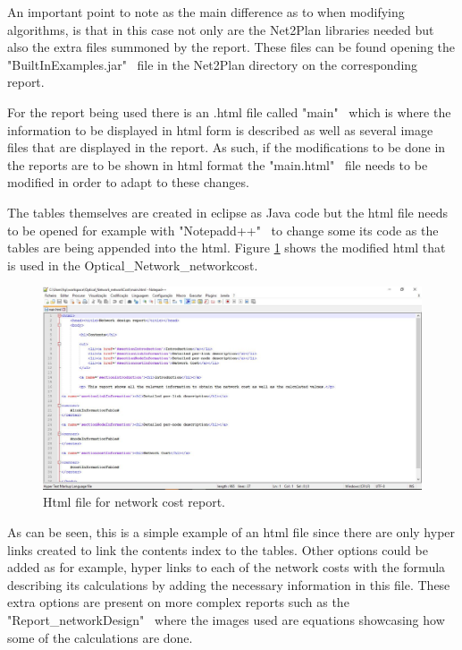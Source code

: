 	An important point to note as the main difference as to when modifying algorithms, is that in this case not only are the Net2Plan libraries needed but also the extra files summoned by the report. These files can be found opening the "BuiltInExamples.jar" \ file in the Net2Plan directory on the corresponding report.

	For the report being used there is an .html file called "main" \ which is where the information to be displayed in html form is described as well as several image files that are displayed in the report. As such, if the modifications to be done in the reports are to be shown in html format the "main.html" \ file needs to be modified in order to adapt to these changes.
	
	The tables themselves are created in eclipse as Java code but the html file needs to be opened for example with "Notepadd++" \ to change some its code as the tables are being appended into the html. Figure \ref{html_report} shows the modified html that is used in the Optical\_Network\_networkcost.
	
	\begin{figure}[h!]
		\centering
		\includegraphics[width = 17cm]{html_report.pdf}
		\caption{Html file for network cost report.}
		\label{html_report}
	\end{figure}	
		
	As can be seen, this is a simple example of an html file since there are only hyper links created to link the contents index to the tables. Other options could be added as for example, hyper links to each of the network costs with the formula describing its calculations by adding the necessary information in this file. These extra options are present on more complex reports such as the "Report\_networkDesign" \ where the images used are equations showcasing how some of the calculations are done.
	

